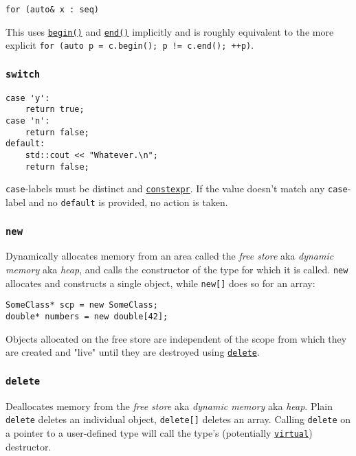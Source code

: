\documentclass[8pt, table, xcdraw]{article}%
\begin{document}
\begin{lstlisting}
for (auto& x : seq)
\end{lstlisting}

This uses \hyperref[begin]{\lstinline{begin()}} and \hyperref[begin]{\lstinline{end()}} implicitly and is roughly equivalent to the more explicit \lstinline{for (auto p = c.begin(); p != c.end(); ++p)}.

\subsubsection{\lstinline{switch}} \label{switch}

\begin{lstlisting}
case 'y':
    return true;
case 'n':
    return false;
default:
    std::cout << "Whatever.\n";
    return false;
\end{lstlisting}

\lstinline{case}-labels must be distinct and \hyperref[constexpr]{\lstinline{constexpr}}. If  the value doesn't match any \lstinline{case}-label and no \lstinline{default} is provided, no action is taken. 


\subsubsection{\lstinline{new}} \label{new}
Dynamically allocates memory from an area called the \textit{free store} aka \textit{dynamic memory} aka \textit{heap}, and calls the constructor of the type for which it is called. \lstinline{new} allocates and constructs a single object, while \lstinline{new[]} does so for an array:

\begin{lstlisting}
SomeClass* scp = new SomeClass;
double* numbers = new double[42];
\end{lstlisting}

Objects allocated on the free store are independent of the scope from which they are created and "live" until they are destroyed using \hyperref[delete]{\lstinline{delete}}.

\subsubsection{\lstinline{delete}} \label{delete}
Deallocates memory from the \textit{free store} aka \textit{dynamic memory} aka \textit{heap}. Plain \lstinline{delete} deletes an individual object, \lstinline{delete[]} deletes an array. Calling \lstinline{delete} on a pointer to a user-defined type will call the type's (potentially \hyperref[virtual]{\lstinline{virtual}}) destructor.
\end{document}
